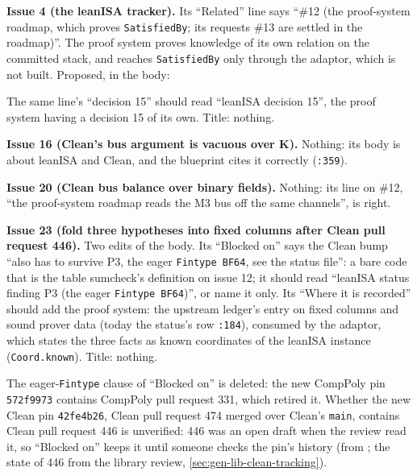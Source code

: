 \begin{sloppypar}
\textbf{Issue 4 (the leanISA tracker).} Its ``Related'' line says ``\#12 (the proof-system roadmap, which proves \texttt{SatisfiedBy}; its requests \#13 are settled in the roadmap)''. The proof system proves knowledge of its own relation on the committed stack, and reaches \texttt{SatisfiedBy} only through the adaptor, which is not built. Proposed, in the body:
\end{sloppypar}


The same line's ``decision 15'' should read ``leanISA decision 15'', the proof system having a decision 15 of its own. Title: nothing.

\textbf{Issue 16 (Clean's bus argument is vacuous over K).} Nothing: its body is about leanISA and Clean, and the blueprint cites it correctly (\texttt{:\allowbreak{}359}).

\textbf{Issue 20 (Clean bus balance over binary fields).} Nothing: its line on \#12, ``the proof-system roadmap reads the M3 bus off the same channels'', is right.

\begin{sloppypar}
\textbf{Issue 23 (fold three hypotheses into fixed columns after Clean pull request 446).} Two edits of the body. Its ``Blocked on'' says the Clean bump ``also has to survive P3, the eager \texttt{Fintype BF64}, see the status file'': a bare code that is the table sumcheck's definition on issue 12; it should read ``leanISA status finding P3 (the eager \texttt{Fintype BF64})'', or name it only. Its ``Where it is recorded'' should add the proof system: the upstream ledger's entry on fixed columns and sound prover data (today the status's row \texttt{:\allowbreak{}184}), consumed by the adaptor, which states the three facts as known coordinates of the leanISA instance (\texttt{Coord.\allowbreak{}known}). Title: nothing.
\end{sloppypar}

\begin{sloppypar}
The eager-\texttt{Fintype} clause of ``Blocked on'' is deleted: the new CompPoly pin \texttt{572f9973} contains CompPoly pull request 331, which retired it. Whether the new Clean pin \texttt{42fe4b26}, Clean pull request 474 merged over Clean's \texttt{main}, contains Clean pull request 446 is unverified: 446 was an open draft when the review read it, so ``Blocked on'' keeps it until someone checks the pin's history (from ; the state of 446 from the library review, \cref{sec:gen-lib-clean-tracking}).
\end{sloppypar}

